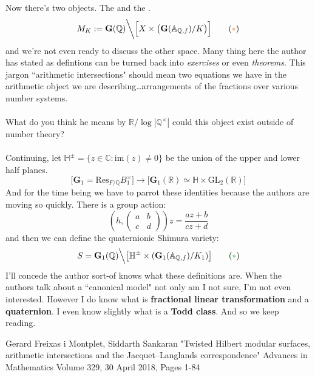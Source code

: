 \documentclass[12pt]{article}
\begin{document}
Now there's two objects.  The {} and the {}.
\[ M_K := \textbf{G}(\mathbb{Q}) \bigg\backslash \Big[ X \times \big(
\textbf{G}(\mathbb{A}_{\mathbb{Q},f})  / K\big) \Big] \tag{{\color{blue!10!orange}{$\ast$}}} \]
and we're not even ready to discuss the other space.  Many thing here the author has stated as defintions can be turned back into \textit{exercises}  or even \textit{theorems}.   This jargon ``arithmetic intersections" should mean two equations we have in the arithmetic object we are describing\dots arrangements of the fractions over various number systems.  \\ \\
What do you think he means by $\mathbb{R}/\log | \mathbb{Q}^\times|$ could this object exist outside of number theory?  \\ \\
Continuing, let $\mathbb{H}^\pm = \{ z \in \mathbb{C} : \text{im}(z) \neq 0 \}$ be the union of the upper and lower half planes.   
$$ \Big[ \textbf{G}_1 = \text{Res}_{F/\mathbb{Q}} B_1^\times \Big] \to \Big[ \textbf{G}_1(\mathbb{R}) \simeq \mathbb{H} \times \text{GL}_2(\mathbb{R}) \Big]$$
And for the time being we have to parrot these identities because the authors are moving so quickly.  There is a group action:
$$ (h, \left( \begin{array}{cc} a & b \\ c & d \end{array} \right)) z = \frac{az+b}{cz+d} $$
and then we can define the quaternionic Shimura variety:
\[ S = \textbf{G}_1(\mathbb{Q}) \Big\backslash \big[ \mathbb{H}^\pm \times 
( \textbf{G}_1(\mathbb{A}_{\mathbb{Q},f}) / K_1) \big]  \tag{{\color{blue!10!green!80!black}{$\ast$}}} \]
I'll concede the author sort-of knows what these definitions are.  When the authors talk about a ``canonical model" not only am I not sure, I'm not even interested.  However I do know what is \textbf{fractional linear transformation} and a \textbf{quaternion}.  I even know slightly what is a {\color{black!70!white}\textbf{Todd class}}.  And so we keep reading.

\vfill

\begin{thebibliography}{}

\item Gerard Freixas i Montplet, Siddarth Sankaran "Twisted Hilbert modular surfaces, arithmetic intersections and the Jacquet–Langlands correspondence" Advances in Mathematics
Volume 329, 30 April 2018, Pages 1-84

\end{thebibliography}
\end{document}
